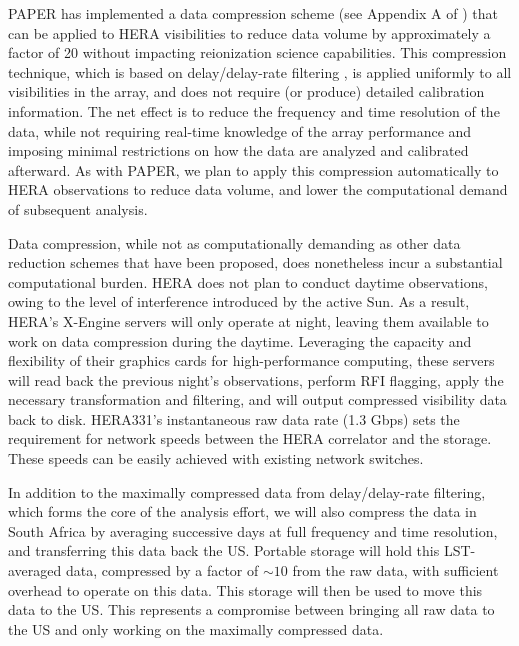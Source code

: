 \documentclass[preprint]{aastex}
\begin{document}
PAPER has implemented a data compression scheme (see Appendix A of
\citealt{parsons_et_al2013}) that can be applied to HERA visibilities
to reduce data volume by approximately a factor of 20 without
impacting reionization science capabilities.  This compression
technique, which is based on delay/delay-rate filtering
\citep{parsons_backer2009}, is applied uniformly to all visibilities
in the array, and does not require (or produce) detailed calibration
information.  The net effect is to reduce the frequency and time
resolution of the data, while not requiring real-time knowledge of the
array performance and imposing minimal restrictions on how the data are
analyzed and calibrated afterward.  As with PAPER, we plan to apply
this compression automatically to HERA observations to reduce data
volume, and lower the computational demand of subsequent analysis.

Data compression, while not as computationally demanding as other data
reduction schemes that have been proposed, does nonetheless incur a
substantial computational burden.  HERA does not plan to conduct
daytime observations, owing to the level of interference introduced by
the active Sun.  As a result, HERA's X-Engine servers will only
operate at night, leaving them available to work on data compression
during the daytime.  Leveraging the capacity and flexibility of their
graphics cards for high-performance computing, these servers will read
back the previous night's observations, perform RFI flagging, apply
the necessary transformation and filtering, and will output compressed
visibility data back to disk.  HERA331's instantaneous raw data rate
(1.3 Gbps) sets the requirement for network speeds between the HERA
correlator and the storage. These speeds can be easily achieved with
existing network switches.

In addition to the maximally compressed data from delay/delay-rate
filtering, which forms the core of the analysis effort, we will also
compress the data in South Africa by averaging successive days at full
frequency and time resolution, and transferring this data back the US.
Portable storage will hold this LST-averaged data, compressed by a
factor of $\sim 10$ from the raw data, with sufficient overhead to
operate on this data.  This storage will then be used to move this
data to the US.  This represents a compromise between bringing all raw
data to the US and only working on the maximally compressed data.
\end{document}
